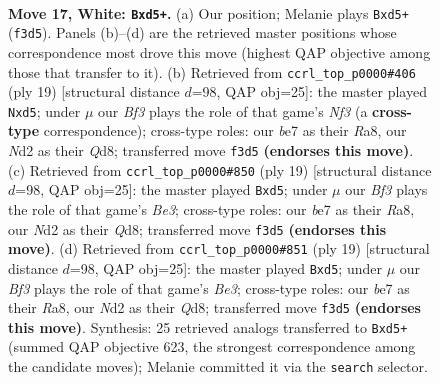 \documentclass[11pt]{article}
\begin{document}
\clearpage

\begin{figure}[p]\centering
\begin{subfigure}{0.46\textwidth}\centering
\resizebox{\linewidth}{!}{%
\newchessgame
\chessboard[
  setfen={rnbqr1k1/p3b2p/2p2pp1/1p1np3/3P3P/1P1Q1BP1/P2NPPK1/RNB2R2 w - - 0 17},
  showmover=false,
  pgfstyle=straightmove, color=movearrow, markmove={f3-d5}
]}
\caption{}
\end{subfigure}\hfill
\begin{subfigure}{0.46\textwidth}\centering
\resizebox{\linewidth}{!}{%
\newchessgame
\chessboard[
  setfen={r2qkb1r/1p1n1pp1/p2pbn2/3Np2p/4P3/1N2BP2/PPPQ2PP/R3KB1R b KQkq - 3 10},
  showmover=false,
  pgfstyle=straightmove, color=movearrow, markmove={f6-d5}
]}
\caption{}
\end{subfigure}
\\[4pt]
\begin{subfigure}{0.46\textwidth}\centering
\resizebox{\linewidth}{!}{%
\newchessgame
\chessboard[
  setfen={r2qkb1r/1p1n1pp1/p2pbn2/3Np2p/4P3/1N2BP2/PPPQ2PP/R3KB1R b KQkq - 1 10},
  showmover=false,
  pgfstyle=straightmove, color=movearrow, markmove={e6-d5}
]}
\caption{}
\end{subfigure}\hfill
\begin{subfigure}{0.46\textwidth}\centering
\resizebox{\linewidth}{!}{%
\newchessgame
\chessboard[
  setfen={r2qkb1r/1p1n1pp1/p2pbn2/3Np2p/4P3/1N2BP2/PPPQ2PP/R3KB1R b KQkq - 1 10},
  showmover=false,
  pgfstyle=straightmove, color=movearrow, markmove={e6-d5}
]}
\caption{}
\end{subfigure}
\caption{\textbf{Move 17, White: \texttt{Bxd5+}.} (a) Our position; Melanie plays \texttt{Bxd5+} (\texttt{f3d5}). Panels (b)--(d) are the retrieved master positions whose correspondence most drove this move (highest QAP objective among those that transfer to it). (b) Retrieved from \texttt{ccrl\_top\_p0000\#406} (ply 19) [structural distance $d$=98, QAP obj=25]: the master played \texttt{Nxd5}; under $\mu$ our \emph{Bf3} plays the role of that game's \emph{Nf3} (a \textbf{cross-type} correspondence); cross-type roles: our \emph{b}e7 as their \emph{R}a8, our \emph{N}d2 as their \emph{Q}d8; transferred move \texttt{f3d5} \textbf{(endorses this move)}. (c) Retrieved from \texttt{ccrl\_top\_p0000\#850} (ply 19) [structural distance $d$=98, QAP obj=25]: the master played \texttt{Bxd5}; under $\mu$ our \emph{Bf3} plays the role of that game's \emph{Be3}; cross-type roles: our \emph{b}e7 as their \emph{R}a8, our \emph{N}d2 as their \emph{Q}d8; transferred move \texttt{f3d5} \textbf{(endorses this move)}. (d) Retrieved from \texttt{ccrl\_top\_p0000\#851} (ply 19) [structural distance $d$=98, QAP obj=25]: the master played \texttt{Bxd5}; under $\mu$ our \emph{Bf3} plays the role of that game's \emph{Be3}; cross-type roles: our \emph{b}e7 as their \emph{R}a8, our \emph{N}d2 as their \emph{Q}d8; transferred move \texttt{f3d5} \textbf{(endorses this move)}. Synthesis: 25 retrieved analogs transferred to \texttt{Bxd5+} (summed QAP objective 623, the strongest correspondence among the candidate moves); Melanie committed it via the \texttt{search} selector.}
\label{fig:thought-m32}
\end{figure}
\end{document}

